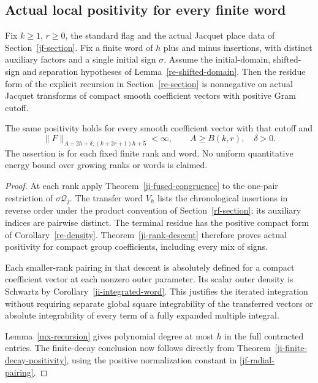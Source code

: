 \subsection{Actual local positivity for every finite word}

\begin{corollary}\label{ji-fused-positivity}
Fix \(k\geq1\), \(r\geq0\), the standard flag and the
actual Jacquet place data of Section~\ref{jf-section}.  Fix a
finite word of \(h\) plus and minus insertions, with distinct
auxiliary factors and a single initial sign \(\sigma\).
Assume the initial-domain, shifted-sign and separation hypotheses
of Lemma~\ref{re-shifted-domain}.  Then the residue form of the
explicit recursion in Section~\ref{re-section} is nonnegative on
actual Jacquet transforms of compact smooth coefficient vectors
with positive Gram cutoff.

The same positivity holds for every smooth coefficient vector
with that cutoff and
\[
       \|F\|_{A+2h+\delta,(k+2r+1)h+5}<\infty,
           \qquad A\geq B(k,r),\quad\delta>0.
\]
The assertion is for each fixed finite rank and word.  No uniform
quantitative energy bound over growing ranks or words is claimed.
\end{corollary}

\begin{proof}
At each rank apply Theorem~\ref{ji-fused-congruence} to the
one-pair restriction of \(\sigma\mathcal Q_j\).  The transfer
word \(V_h\) lists the chronological insertions in reverse
order under the product convention of Section~\ref{rf-section};
its auxiliary indices are pairwise distinct.  The terminal residue
has the positive compact form of Corollary~\ref{re-density}.
Theorem~\ref{ji-rank-descent} therefore proves actual positivity
for compact group coefficients, including every mix of signs.

Each smaller-rank pairing in that descent is absolutely defined
for a compact coefficient vector at each nonzero outer parameter.
Its scalar outer density is Schwartz by
Corollary~\ref{ji-integrated-word}.  This justifies the iterated
integration without requiring separate global square integrability
of the transferred vectors or absolute integrability of every
term of a fully expanded multiple integral.

Lemma~\ref{mx-recursion} gives polynomial degree at most \(h\)
in the full contracted entries.  The finite-decay conclusion now
follows directly from Theorem~\ref{ji-finite-decay-positivity},
using the positive normalization constant in
\eqref{jf-radial-pairing}.
\end{proof}

